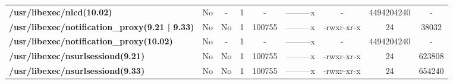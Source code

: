 \begin{center}
{\begin{tabular}{|>{\bfseries} l | C | C | C | C | C | C | C | C |}
					/usr/libexec/nlcd(10.02) & No & - & 1 & - & ---------x & - & 4494204240 & -\\ 
					/usr/libexec/notification\_proxy(9.21 | 9.33) & No & No & \color{green}1 & \color{red}100755 & \color{green}---------x & \color{red}-rwxr-xr-x & \color{green}24 & \color{red}38032\\ 
					/usr/libexec/notification\_proxy(10.02) & No & - & 1 & - & ---------x & - & 4494204240 & -\\ 
					/usr/libexec/nsurlsessiond(9.21) & No & No & \color{green}1 & \color{red}100755 & \color{green}---------x & \color{red}-rwxr-xr-x & \color{green}24 & \color{red}623808\\ 
					/usr/libexec/nsurlsessiond(9.33) & No & No & \color{green}1 & \color{red}100755 & \color{green}---------x & \color{red}-rwxr-xr-x & \color{green}24 & \color{red}654240\\ 

			\end{tabular}
		}
	\end{center}




